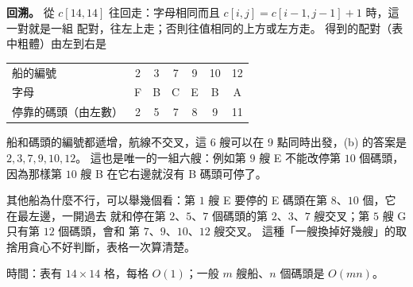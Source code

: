 \begin{pastsoln}
\textbf{回溯。} 從 $c[14, 14]$ 往回走：字母相同而且 $c[i, j] = c[i-1, j-1] + 1$ 時，這一對就是一組
配對，往左上走；否則往值相同的上方或左方走。 得到的配對（表中粗體）由左到右是
\begin{center}
\small
\begin{tabular}{lcccccc}
\toprule
船的編號 & 2 & 3 & 7 & 9 & 10 & 12 \\
字母 & F & B & C & E & B & A \\
停靠的碼頭（由左數） & 2 & 5 & 7 & 8 & 9 & 11 \\
\bottomrule
\end{tabular}
\end{center}
船和碼頭的編號都遞增，航線不交叉，這 $6$ 艘可以在 9 點同時出發，(b) 的答案是 $2, 3, 7, 9, 10, 12$。
這也是唯一的一組六艘：例如第 $9$ 艘 E 不能改停第 $10$ 個碼頭，因為那樣第 $10$ 艘 B 在它右邊就沒有
B 碼頭可停了。

其他船為什麼不行，可以舉幾個看：第 $1$ 艘 E 要停的 E 碼頭在第 $8$、$10$ 個，它在最左邊，一開過去
就和停在第 $2$、$5$、$7$ 個碼頭的第 $2$、$3$、$7$ 艘交叉；第 $5$ 艘 G 只有第 $12$ 個碼頭，會和
第 $7$、$9$、$10$、$12$ 艘交叉。 這種「一艘換掉好幾艘」的取捨用貪心不好判斷，表格一次算清楚。

時間：表有 $14 \times 14$ 格，每格 $O(1)$；一般 $m$ 艘船、$n$ 個碼頭是 $O(mn)$。
\end{pastsoln}
